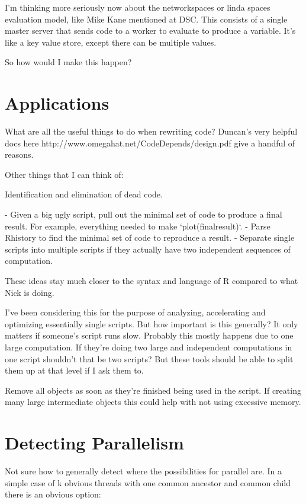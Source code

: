 \documentclass[12pt]{article}
\begin{document}
I'm thinking more seriously now about the networkspaces or linda spaces
evaluation model, like Mike Kane mentioned at DSC. This consists of a
single master server that sends code to a worker to evaluate to produce a
variable. It's like a key value store, except there can be multiple values.

So how would I make this happen?


\section{Applications}

What are all the useful things to do when rewriting code?  Duncan's very
helpful docs here http://www.omegahat.net/CodeDepends/design.pdf give a
handful of reasons.

Other things that I can think of:

Identification and elimination of dead code.

- Given a big ugly script, pull out the minimal set of code to produce a
  final result. For example, everything needed to make `plot(finalresult)`.
- Parse Rhistory to find the minimal set of code to reproduce a result.
- Separate single scripts into multiple scripts if they actually have two
  independent sequences of computation.

These ideas stay much closer to the syntax and language of R compared to
what Nick is doing.

I've been considering this for the purpose of analyzing, accelerating and
optimizing essentially single scripts. But how important is this generally?
It only matters if someone's script runs slow. Probably this mostly happens
due to one large computation. If they're doing two large and independent
computations in one script shouldn't that be two scripts? But these tools
should be able to split them up at that level if I ask them to.

Remove all objects as soon as they're finished being used in the script. If
creating many large intermediate objects this could help with not using
excessive memory.

\section{Detecting Parallelism}

Not sure how to generally detect where the possibilities for
parallel are. In a simple case of k obvious threads with one common
ancestor and common child there is an obvious option:
\end{document}
